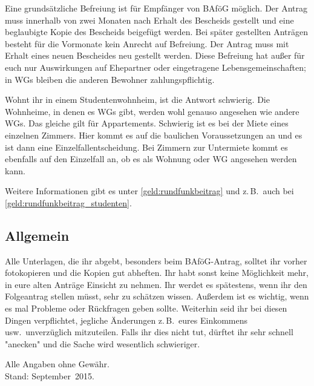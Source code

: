\begin{multicols*}{2}
Eine grundsätzliche Befreiung ist für Empfänger von BAföG möglich. Der Antrag muss innerhalb von zwei Monaten nach Erhalt des Bescheids gestellt und eine beglaubigte Kopie des Bescheids beigefügt werden. Bei später gestellten Anträgen besteht für die Vormonate kein Anrecht auf Befreiung. Der Antrag muss mit Erhalt eines neuen Bescheides neu gestellt werden. Diese Befreiung hat außer für euch nur Auswirkungen auf Ehepartner oder eingetragene Lebensgemeinschaften; in WGs bleiben die anderen Bewohner zahlungspflichtig.

Wohnt ihr in einem Studentenwohnheim, ist die Antwort schwierig. Die Wohnheime, in denen es WGs gibt, werden wohl genauso angesehen wie andere WGs. Das gleiche gilt für Appartements. Schwierig ist es bei der Miete eines einzelnen Zimmers. Hier kommt es auf die baulichen Voraussetzungen an und es ist dann eine Einzelfallentscheidung. Bei Zimmern zur Untermiete kommt es ebenfalls auf den Einzelfall an, ob es als Wohnung oder WG angesehen werden kann.

Weitere Informationen gibt es unter \cref{geld:rundfunkbeitrag} und z.\,B.\ auch bei \cref{geld:rundfunkbeitrag_studenten}.
\vspace{-1em}
\subsection*{Allgemein}
Alle Unterlagen, die ihr abgebt, besonders beim BAföG-Antrag, solltet ihr vorher fotokopieren und die Kopien gut abheften. Ihr habt sonst keine Möglichkeit mehr, in eure alten Anträge Einsicht zu nehmen. Ihr werdet es spätestens, wenn ihr den Folgeantrag stellen müsst, sehr zu schätzen wissen. Außerdem ist es wichtig, wenn es mal Probleme oder Rückfragen geben sollte. Weiterhin seid ihr bei diesen Dingen verpflichtet, jegliche Änderungen z.\,B.\ eures Einkommens usw.\ unverzüglich mitzuteilen. Falls ihr dies nicht tut, dürftet ihr sehr schnell "anecken" und die Sache wird wesentlich schwieriger.

\begin{flushright}
Alle Angaben ohne Gewähr.\\
Stand: September~2015.
\end{flushright}


\end{multicols*}
